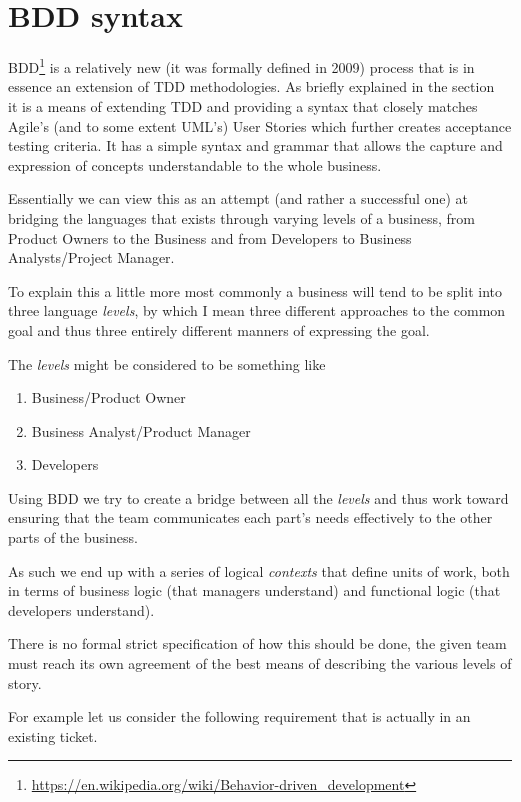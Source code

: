 \documentclass[a4paper, titlepage]{article}
\begin{document}
\section{BDD syntax}
  BDD\footnote{\url{https://en.wikipedia.org/wiki/Behavior-driven_development}}
  is a relatively new (it was formally defined in 2009) process that is in
  essence an extension of TDD methodologies. As briefly explained in the
  section~ it is a means of extending TDD and
  providing a syntax that closely matches Agile's (and to some extent UML's) User
  Stories which further creates acceptance testing criteria. 
  It has a simple syntax and
  grammar that allows the capture and expression of concepts
  understandable to the whole business.

  Essentially we can view this as an attempt (and rather a successful
  one) at bridging the languages that exists through varying levels of
  a business, from Product Owners to the Business and from Developers to
  Business Analysts/Project Manager. 
  
  To explain this a little more most commonly a business will tend to be split
  into three language \textit{levels}, by which I mean three different approaches
  to the common goal and thus three entirely different manners of
  expressing the goal.

  The \textit{levels} might be considered to be something like
  
  \begin{enumerate}
    \item{Business/Product Owner}
    \item{Business Analyst/Product Manager}
    \item{Developers}
  \end{enumerate}
  
  Using BDD we try to create a bridge between all the \textit{levels} and thus
  work toward ensuring that the team communicates each part's needs
  effectively to the other parts of the business. 

  As such we end up with a series of logical \textit{contexts} that define
  units of work, both in terms of business logic (that managers
  understand) and functional logic (that developers understand).

  There is no formal strict specification of how this should be done,
  the given team must reach its own agreement of the best means of
  describing the various levels of story.

  For example let us consider the following requirement that is actually
  in an existing ticket. 
\end{document}
